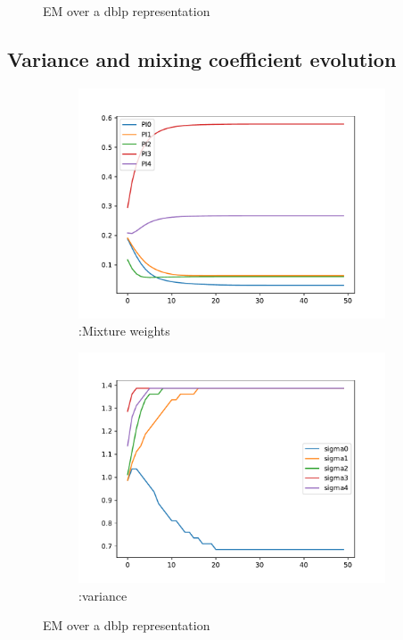 \documentclass{article}
\begin{document}
\begin{figure}[!ht]
\begin{subfigure}[b]{0.48\linewidth}
        \end{subfigure}    
        \caption{EM over a dblp representation}
        \label{fig:embedding}
    \end{figure}
    \subsection{Variance and mixing coefficient evolution}

    \begin{figure}[!ht]
        \centering
        \begin{subfigure}[b]{0.48\linewidth}
            \centering
            \includegraphics[scale=0.5]{media/_mixture_weights.pdf}
            \caption{\label{fig:n1}:Mixture weights}
        \end{subfigure}
        \begin{subfigure}[b]{0.48\linewidth}
             \centering
            \includegraphics[scale=0.5]{media/_variances.pdf}
            \caption{\label{fig:n2}:variance}
    
        \end{subfigure}
        \caption{EM over a dblp representation}
        \label{fig:embedding}
    \end{figure}
\end{document}
